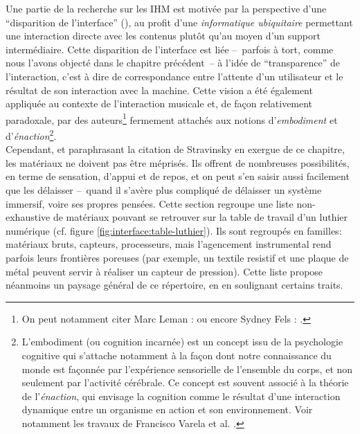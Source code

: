 \noindent Une partie de la recherche sur les \gls{IHM} est motivée par la perspective d'une ``disparition de l'interface'' (\cite{weiser_computer_1991, dey_distributed_2001, hui_towards_2017}), au profit d'une \textit{informatique ubiquitaire} permettant une interaction directe avec les contenus plutôt qu'au moyen d'un support intermédiaire. Cette disparition de l'interface est liée --~parfois à tort, comme nous l'avons objecté dans le chapitre précédent~-- à l'idée de ``transparence'' de l'interaction, c'est à dire de correspondance entre l'attente d'un utilisateur et le résultat de son interaction avec la machine. Cette vision a été également appliquée au contexte de l'interaction musicale et, de façon relativement paradoxale, par des auteurs\footnote{On peut notamment citer Marc Leman : \cite{leman_embodied_2008} ou encore Sydney Fels :  \cite{fels_mapping_2002}.} fermement attachés aux notions d'\textit{embodiment} et d'\textit{énaction}\footnote{L'embodiment (ou cognition incarnée) est un concept issu de la psychologie cognitive qui s'attache notamment à la façon dont notre connaissance du monde est façonnée par l'expérience sensorielle de l'ensemble du corps, et non seulement par l'activité cérébrale. Ce concept est souvent associé à la théorie de l'\textit{énaction}, qui envisage la cognition comme le résultat d'une interaction dynamique entre un organisme en action et son environnement. Voir notamment les travaux de Francisco Varela et al. \cite{varela_inscription_1993}.}.\\
\indent Cependant, et paraphrasant la citation de Stravinsky en exergue de ce chapitre, les matériaux ne doivent pas être méprisés. Ils offrent de nombreuses possibilités, en terme de sensation, d'appui et de repos, et on peut s'en saisir aussi facilement que les délaisser --~quand il s'avère plus compliqué de délaisser un système immersif, voire ses propres pensées. Cette section regroupe une liste non-exhaustive de matériaux pouvant se retrouver sur la table de travail d'un luthier numérique (cf. figure \ref{fig:interface:table-luthier}). Ils sont regroupés en familles: matériaux bruts, capteurs, processeurs, mais l'agencement instrumental rend parfois leurs frontières poreuses (par exemple, un textile resistif et une plaque de métal peuvent servir à réaliser un capteur de pression). Cette liste propose néanmoins un paysage général de ce répertoire, en en soulignant certains traits.

